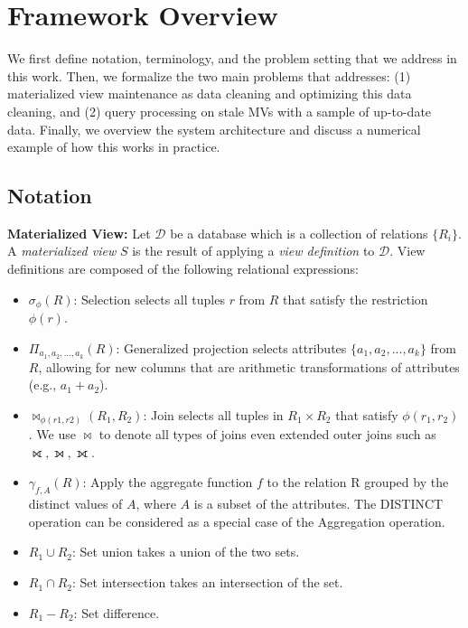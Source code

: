 \vspace{-1em}
\section{Framework Overview}\label{sec-arch}
We first define notation, terminology, and the problem setting that we address in this work.
Then, we formalize the two main problems that \svc addresses: (1) materialized view maintenance as data cleaning and optimizing this data cleaning, and (2) query processing on stale MVs with a sample of up-to-date data.
Finally, we overview the system architecture and discuss a numerical example of how this works in practice.

\subsection{Notation}\label{notation}
\noindent \textbf{Materialized View:} Let $\mathcal{D}$ be a database which is a collection of relations $\{R_i\}$. A \emph{materialized view} $S$ is the result of applying a \emph{view definition} to $\mathcal{D}$. 
View definitions are composed of the following relational expressions:
\begin{itemize}[noitemsep] \sloppy
	\item $\sigma_{\phi}(R)$: Selection selects all tuples $r$ from $R$ that satisfy the restriction $\phi (r)$.
	\item $\Pi_{a_1,a_2,...,a_k}(R)$: Generalized projection selects attributes $\{a_1,a_2,...,a_k\}$ from $R$, allowing for new columns that are arithmetic transformations of attributes (e.g., $a_1+a_2$).
	\item $\bowtie_{\phi (r1,r2)}(R_1,R_2)$: Join selects all tuples in $R_1 \times R_2$ that satisfy $\phi (r_1,r_2)$. We use $\bowtie$ to denote all types of joins even extended outer joins such as $\rightouterjoin,\leftouterjoin,\fullouterjoin$.
	\item $\gamma_{f,A}(R)$: Apply the aggregate function $f$ to the relation R grouped by the distinct values of $A$, where $A$ is a subset of the attributes. %
	The DISTINCT operation can be considered as a special case of the Aggregation operation. 
	\item $R_1 \cup R_2$: Set union takes a union of the two sets.
	\item $R_1 \cap R_2$: Set intersection takes an intersection of the set.
	\item $R_1 - R_2$: Set difference.
\end{itemize}
